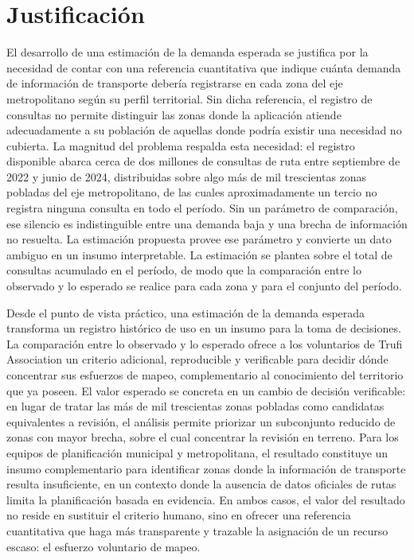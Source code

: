 \chapter{Justificación}
\label{cap:justificacion}

El desarrollo de una estimación de la demanda esperada se justifica por la necesidad de
contar con una referencia cuantitativa que indique cuánta demanda de información de
transporte debería registrarse en cada zona del eje metropolitano según su perfil
territorial. Sin dicha referencia, el registro de consultas no permite distinguir las zonas
donde la aplicación atiende adecuadamente a su población de aquellas donde podría existir
una necesidad no cubierta. La magnitud del problema respalda esta necesidad: el registro
disponible abarca cerca de dos millones de consultas de ruta entre septiembre de 2022 y
junio de 2024, distribuidas sobre algo más de mil trescientas zonas pobladas del eje
metropolitano, de las cuales aproximadamente un tercio no registra ninguna consulta en todo
el período. Sin un parámetro de comparación, ese silencio es indistinguible entre una
demanda baja y una brecha de información no resuelta. La estimación propuesta provee ese
parámetro y convierte un dato ambiguo en un insumo interpretable. La estimación se plantea
sobre el total de consultas acumulado en el período, de modo que la comparación entre lo
observado y lo esperado se realice para cada zona y para el conjunto del período.

Desde el punto de vista práctico, una estimación de la demanda esperada transforma un
registro histórico de uso en un insumo para la toma de decisiones. La comparación entre lo
observado y lo esperado ofrece a los voluntarios de Trufi Association un criterio
adicional, reproducible y verificable para decidir dónde concentrar sus esfuerzos de
mapeo, complementario al conocimiento del territorio que ya poseen. El valor esperado se
concreta en un cambio de decisión verificable: en lugar de tratar las más de mil
trescientas zonas pobladas como candidatas equivalentes a revisión, el análisis permite
priorizar un subconjunto reducido de zonas con mayor brecha, sobre el cual concentrar la
revisión en terreno. Para los equipos
de planificación municipal y metropolitana, el resultado constituye un insumo
complementario para identificar zonas donde la información de transporte resulta
insuficiente, en un contexto donde la ausencia de datos oficiales de rutas limita la
planificación basada en evidencia. En ambos casos, el valor del resultado no reside en
sustituir el criterio humano, sino en ofrecer una referencia cuantitativa que haga más
transparente y trazable la asignación de un recurso escaso: el esfuerzo voluntario de
mapeo.

